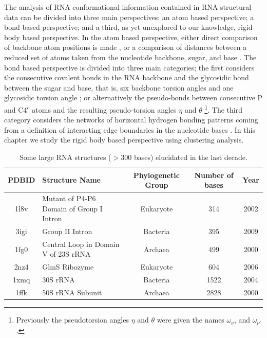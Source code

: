 \noindent The analysis of  RNA conformational information contained in
RNA structural  data can be  divided into three main  perspectives: an
atom based perspective; a bond  based perspective; and a third, as yet
unexplored  to our  knowledge, rigid-body  based perspective.   In the
atom  based perspective,  either  direct comparison  of backbone  atom
positions is  made \cite{reijmers2001},  or a comparison  of distances
between a  reduced set  of atoms taken  from the  nucleotide backbone,
sugar,  and  base \cite{sykes2005}.   The  bond  based perspective  is
divided  into   three  main   categories;  the  first   considers  the
consecutive covalent bonds in the RNA backbone and the glycosidic bond
between the sugar  and base, that is, six  backbone torsion angles and
one   glycosidic   torsion   angle   \cite{reijmers2001,   murray2003,
  hershkovitz2003,  schneider2004, hershkovitz2006};  or alternatively
the  pseudo-bonds between consecutive  P and  C4$^{\rm{\prime}}$ atoms
and   the  resulting   pseudo-torsion  angles   $\eta$   and  $\theta$
\cite{olson1_1972,               duarte1998,               duarte2003,
  wadley2007} \footnote{Previously the pseudotorsion angles $\eta$ and
  $\theta$    were    given     the    names    $\omega_{\nu}$,    and
  $\omega_{\nu'}$.\cite{malathi1985}}.   The  third category
considers the networks of  horizontal hydrogen bonding patterns coming
from  a definition of  interacting edge  boundaries in  the nucleotide
bases \cite{westhof2000, leontis2002, leontis2006}. In this chapter we
study the rigid body based perspective using clustering analysis.
\begin{table}[htbp]
\begin{center}
{\small
\begin{tabular}{c|p{5cm}|c|c|c}
\hline
\bf{PDBID} & \bf{Structure Name} & \bf{Phylogenetic Group} & \bf{Number of bases} & \bf{Year} \\ \hline
1l8v & Mutant of P4-P6 Domain of Group I Intron & Eukaryote & 314 & 2002 \\ \hline
3igi & Group II Intron & Bacteria & 395 & 2009 \\ \hline
1fg0 & Central Loop in Domain V of 23S rRNA & Archaea & 499 & 2000 \\ \hline
2nz4 & GlmS Ribozyme & Eukaryote & 604 & 2006 \\ \hline
1xmq & 30S rRNA & Bacteria & 1522 & 2004 \\ \hline
1ffk & 50S rRNA Subunit & Archaea & 2828 & 2000 \\ \hline
\end{tabular}
}
\caption{Some large  RNA structures  ($>$300 bases) elucidated  in the
  last decade.}
\end{center}
\label{tab:rnarange}
\end{table}

